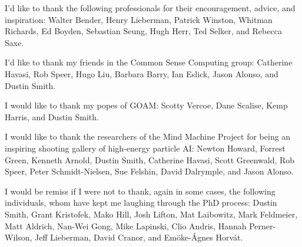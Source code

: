 \vspace{5mm}

\noindent I'd like to thank the following professionals for their encouragement, advice, and inspiration:
Walter Bender,
Henry Lieberman,
Patrick Winston,
Whitman Richards,
Ed Boyden,
Sebastian Seung,
Hugh Herr,
Ted Selker, and
Rebecca Saxe.

\vspace{5mm}

\noindent I'd like to thank my friends in the Common Sense Computing group:
Catherine Havasi,
Rob Speer,
Hugo Liu,
Barbara Barry,
Ian Eslick,
Jason Alonso, and
Dustin Smith.

\vspace{5mm}

\noindent I would like to thank my popes of GOAM:
Scotty Vercoe,
Dane Scalise,
Kemp Harris, and
Dustin Smith.

\vspace{5mm}

\noindent I would like to thank the researchers of the Mind Machine Project for being an inspiring shooting gallery of high-energy particle AI:
Newton Howard, Forrest Green, Kenneth Arnold, Dustin Smith, Catherine Havasi, Scott Greenwald, Rob Speer, Peter Schmidt-Nielsen, Sue Felshin, David Dalrymple, and Jason Alonso.

\vspace{5mm}

\noindent I would be remiss if I were not to thank, again in some cases, the following individuals,
whom have kept me laughing through the PhD process:
Dustin Smith, %
Grant Kristofek, %
Mako Hill, %
Josh Lifton, %
Mat Laibowitz, %
Mark Feldmeier, %
Matt Aldrich, %
Nan-Wei Gong, %
Mike Lapinski, %
Clio Andris, %
Hannah Perner-Wilson, %
Jeff Lieberman, %
David Cranor, and %
Em\"{o}ke-\'{A}gnes Horv\'{a}t. %

\endgroup

